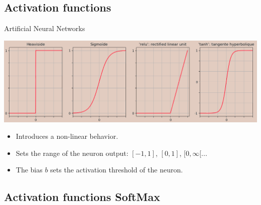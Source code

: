 \documentclass[10pt,serif,mathserif,compress,hyperref={colorlinks}]{beamer}
\begin{document}
\subsection{Activation functions}

\begin{frame}{Artificial Neural Networks}
  
  \begin{tcolorbox}[title={Common activation functions}]
    \hspace*{-5mm}\includegraphics[width=1.1\textwidth]{images/activ_functions-2.png}
  \end{tcolorbox}
  
  \begin{itemize}
  \item Introduces a non-linear behavior.
  \item Sets the range of the neuron output: $[-1, 1]$, $[0, 1]$, $[0, \infty[$...
    \item The bias $b$ sets the activation threshold of the neuron.
  \end{itemize}
  
\end{frame}

\subsection{Activation functions SoftMax}
\end{document}
